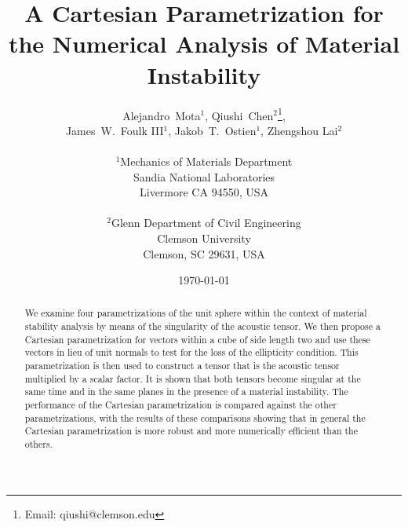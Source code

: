 \documentclass[12pt]{article}
\numberwithin{equation}{section}
\begin{document}





\title{A Cartesian Parametrization for the Numerical Analysis of
  Material Instability}

\author{
  \Large Alejandro~Mota$^1$,
  Qiushi~Chen$^2$\thanks{Email: qiushi@clemson.edu},
  \\
  \Large James~W.~Foulk {III}$^1$,
  Jakob~T.~Ostien$^1$, Zhengshou Lai$^2$
  \\
  \\
  $^1$Mechanics of Materials Department\\
  Sandia National Laboratories\\
  Livermore CA 94550, USA\\
  \\
  $^2$Glenn Department of Civil Engineering\\
  Clemson University\\
  Clemson, SC 29631, USA\\
}

\date{\today}

\maketitle

\begin{abstract}
  We examine four parametrizations of the unit sphere within the
  context of material stability analysis by means of the singularity
  of the acoustic tensor. We then propose a Cartesian parametrization
  for vectors within a cube of side length two and use these vectors
  in lieu of unit normals to test for the loss of the ellipticity
  condition. This parametrization is then used to construct a tensor
  that is the acoustic tensor multiplied by a scalar factor. It is
  shown that both tensors become singular at the same time and in the
  same planes in the presence of a material instability. The
  performance of the Cartesian parametrization is compared against the
  other parametrizations, with the results of these comparisons
  showing that in general the Cartesian parametrization is more robust
  and more numerically efficient than the others.
\end{abstract}
\end{document}
